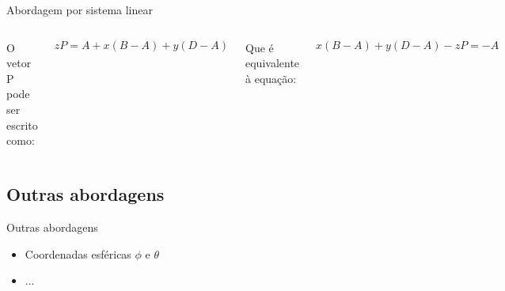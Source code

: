 \documentclass{beamer}
\begin{document}
\begin{frame}{Abordagem por sistema linear}
	\begin{columns}
		\pause
		O vetor P pode ser escrito como:

		\begin{equation*}
		zP = A + x(B-A) + y(D-A)
		\end{equation*}

		\pause
		Que é equivalente à equação:

		\begin{equation*}
		x(B-A) + y(D-A) - zP = -A
		\end{equation*}

		\includegraphics[keepaspectratio, width=1.0\textwidth, height=0.8\textheight, clip, trim=0.75in 0.75in 0.70in 0.50in]{../monografia/img/lineq.pdf}
	\end{columns}
\end{frame}


\subsection{Outras abordagens}

\begin{frame}{Outras abordagens}
	\pause
	\begin{itemize}
	\item Coordenadas esféricas $\phi$ e $\theta$
	\pause
	\item ...
	\end{itemize}
\end{frame}
\end{document}
